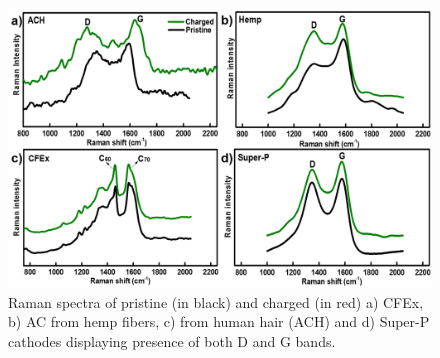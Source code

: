  \begin{figure}[h!]
  \centering
  \includegraphics[width=\textwidth]{Figures/chap5fig/raman}
    \caption{Raman spectra of pristine (in black) and charged (in red) a) CFEx, b) AC from hemp fibers, c) from human hair (ACH) and d) Super-P cathodes displaying presence of both D and G bands.}
  \label{Figures/chap5fig:raman}
\end{figure}

